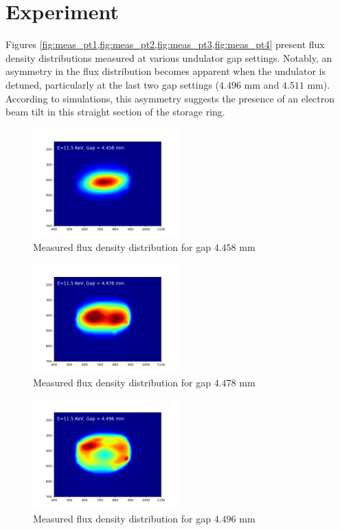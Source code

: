 \documentclass[a4paper,12pt]{article}
\begin{document}
\section{Experiment}

Figures \ref{fig:meas_pt1,fig:meas_pt2,fig:meas_pt3,fig:meas_pt4}  present flux density distributions measured
 at various undulator gap settings. Notably, an asymmetry
  in the flux distribution becomes apparent when the
   undulator is detuned, particularly at the last two
    gap settings ($4.496$ mm and $4.511$ mm). According to simulations,
     this asymmetry suggests the presence of an electron beam tilt
      in this straight section of the storage ring.

\begin{figure}[H]
\centering
\includegraphics[width=0.5\textwidth]{images_E11500eV_G4.458mm.png}
\caption{Measured flux density distribution for gap $4.458$ mm}
\label{fig:meas_pt1}
\end{figure}

\begin{figure}[H]
\centering
\includegraphics[width=0.5\textwidth]{images_E11500eV_G4.478mm.png}
\caption{Measured flux density distribution for gap $4.478$ mm}
\label{fig:meas_pt2}
\end{figure}

\begin{figure}[H]
\centering
\includegraphics[width=0.5\textwidth]{images_E11500eV_G4.496mm.png}
\caption{Measured flux density distribution for gap $4.496$ mm}
\label{fig:meas_pt3}
\end{figure}
\end{document}
